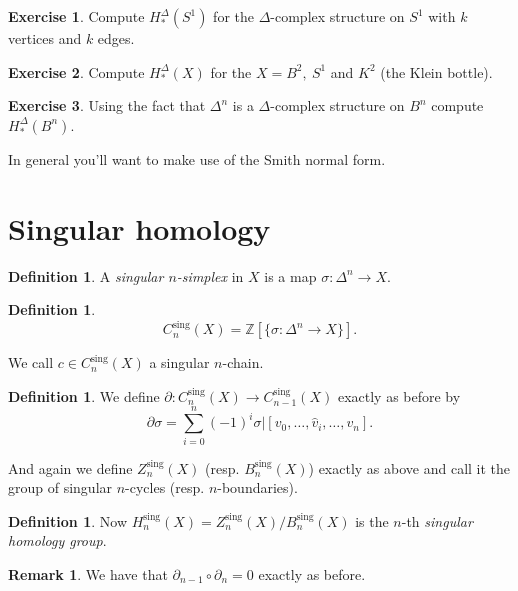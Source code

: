 \documentclass[12pt]{article}
\theoremstyle{definition}
\theoremstyle{definition}
\newtheorem{defn}[thm]{Definition}
\newtheorem*{exer}{Exercise}
\newtheorem*{rmk}{Remark}
\newcommand{\ZZ}{\mathbb{Z}}
\renewcommand{\H}{H_*}
\begin{document}
\begin{exer}
Compute $\H^\Delta (S^1)$ for the $\Delta$-complex structure on $S^1$ with $k$ vertices and $k$ edges.
\end{exer}

\begin{exer}
Compute $\H^\Delta (X)$ for the $X = B^2,\ S^1$ and $K^2$ (the Klein bottle).
\end{exer}

\begin{exer}
Using the fact that $\Delta^n$ is a $\Delta$-complex structure on $B^n$ compute $\H^\Delta (B^n)$.

In general you'll want to make use of the Smith normal form.
\end{exer}

\section{Singular homology}
\begin{defn}
A \emph{singular $n$-simplex} in $X$ is a map $\sigma \colon \Delta^n \to X$.
\end{defn}

\begin{defn}
\[
C_n^{\text{sing}}(X) = \ZZ[\{\sigma\colon \Delta^n \to X\}].\]
\end{defn}

We call $c \in C_n^\text{sing}(X)$ a singular $n$-chain.

\begin{defn}
We define $\partial\colon C_n^\text{sing}(X) \to C_{n-1}^\text{sing}(X)$ exactly as before by
\[\partial \sigma = \sum_{i=0}^{n} (-1)^i \sigma|[v_0,\ldots,\hat{v}_i, \ldots, v_n].\]
\end{defn}

And again we define $Z_n^\text{sing}(X)$ (resp. $B_n^\text{sing}(X)$) exactly as above and call it the group of singular $n$-cycles (resp. $n$-boundaries).

\begin{defn}
Now $H_n^\text{sing}(X) = Z_n^\text{sing}(X)/B_n^\text{sing}(X)$ is the $n$-th \emph{singular homology group}.
\end{defn}

\begin{rmk}
We have that $\partial_{n-1}\circ \partial_n = 0$ exactly as before.
\end{rmk}
\end{document}
